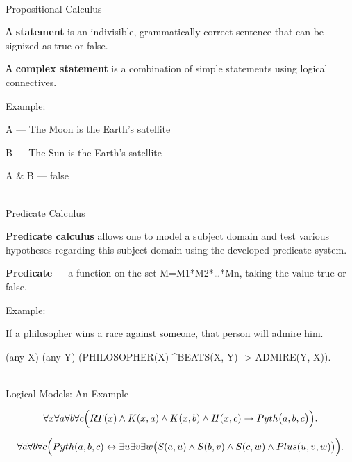 \begin{frame}{\\Propositional Calculus}
	\topline
	\justifying
	
	А \textbf{statement} is an indivisible, grammatically correct sentence that can be signized as true or false.
	
	\vspace{1em}
	
	А \textbf{complex statement} is a combination of simple statements using logical connectives.
	
	\vspace{1em}
	
	Example:
	\begin{textitemize}
		\item A --- The Moon is the Earth's satellite
		\item B --- The Sun is the Earth's satellite
		\item A \& B --- false
	\end{textitemize}
	
\end{frame}

\begin{frame}{\\Predicate Calculus}
	\topline
	\justifying
	
	\textbf{Predicate calculus} allows one to model a subject domain and test various hypotheses regarding this subject domain using the developed predicate system.
	
	\vspace{1em}
	
	\textbf{Predicate} --- a function on the set M=M1*M2*…*Mn, taking the value true or false.
	
	\vspace{1em}
	
	Example:
	\begin{textitemize}
		\item If a philosopher wins a race against someone, that person will admire him.
		\item (any X) (any Y) (PHILOSOPHER(X) \textasciicircum BEATS(X, Y) -> ADMIRE(Y, X)).
	\end{textitemize}
	
\end{frame}

\begin{frame}{\\Logical Models: An Example}
	\topline
	\justifying
	
	\[
	\forall x \forall a \forall b \forall c \Bigl(
	RT(x) \land K(x,a) \land K(x,b) \land H(x,c)
	\rightarrow
	Pyth\bigl(a,b,c\bigr)
	\Bigr).
	\]
	
	\[
	\forall a \forall b \forall c \Bigl(
	Pyth(a,b,c) \leftrightarrow
	\exists u \exists v \exists w \bigl(
	S(a,u) \land S(b,v) \land S(c,w) \land Plus(u,v,w)
	\bigr)
	\Bigr).
	\]
	
\end{frame}

